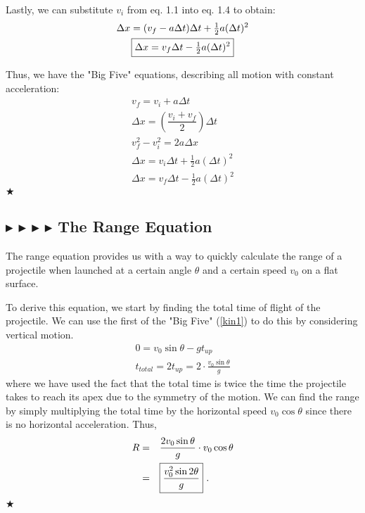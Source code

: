 \noindent Lastly, we can substitute $v_i$ from eq. 1.1 into eq. 1.4 to obtain:
\begin{gather}
\Delta x = (v_f-a\Delta t)\Delta t + \tfrac12 a(\Delta t)^2  \nonumber \\
\boxed{\Delta x = v_f\Delta t - \tfrac12 a(\Delta t)^2}
\end{gather}

\noindent Thus, we have the "Big Five" equations, describing all motion with constant acceleration:
\begin{gather}
v_f = v_i + a\Delta t \label{kin1}\\
\Delta x = \left( \dfrac{v_i + v_f}{2}\right) \Delta t \label{kin2} \\
v_f^2 - v_i^2 = 2a\Delta x \label{kin3} \\
\Delta x = v_i\Delta t + \tfrac12 a (\Delta t)^2 \label{kin4} \\
\Delta x = v_f\Delta t - \tfrac12 a(\Delta t)^2 \label{kin5}
\end{gather}
$\bigstar$


\subsection{\color{OrangeRed} $\blacktriangleright$ \color{PineGreen} $\blacktriangleright$ \color{Goldenrod} $\blacktriangleright$ \color{Orchid} $\blacktriangleright$ \color{black} The Range Equation}

\noindent The range equation provides us with a way to quickly calculate the range of a projectile when launched at a certain angle $\theta$ and a certain speed $v_0$ on a flat surface.

\noindent To derive this equation, we start by finding the total time of flight of the projectile. We can use the first of the "Big Five" (\ref{kin1}) to do this by considering vertical motion.
\begin{gather}
0 = v_0 \sin \theta - gt_{up} \\
t_{total} = 2t_{up} = 2\cdot \frac{v_0 \sin{\theta}}{g}
\end{gather}
\noindent where we have used the fact that the total time is twice the time the projectile takes to reach its apex due to the symmetry of the motion. We can find the range by simply multiplying the total time by the horizontal speed $v_0 \cos \theta$ since there is no horizontal acceleration. Thus,
\begin{align}
    R =&\quad \frac{2v_0 \sin{\theta}}{g} \cdot v_0 \cos \theta \nonumber \\
    =&\quad \boxed{\frac{v_0^2 \sin{2\theta}}{g}} \text{ .}
\end{align}
$\bigstar$


